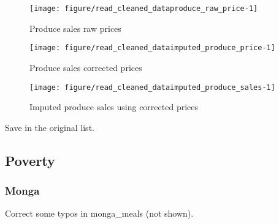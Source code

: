 \begin{Schunk}
\begin{figure}

{\centering \texttt{[image: figure/read\_cleaned\_dataproduce\_raw\_price-1]} 

}

\caption[Produce sales raw prices]{Produce sales raw prices}\label{Figure produce raw price}
\end{figure}
\end{Schunk}
\begin{Schunk}
\begin{figure}

{\centering \texttt{[image: figure/read\_cleaned\_dataimputed\_produce\_price-1]} 

}

\caption[Produce sales corrected prices]{Produce sales corrected prices}\label{Figure imputed produce price}
\end{figure}
\end{Schunk}
\begin{Schunk}
\begin{figure}

{\centering \texttt{[image: figure/read\_cleaned\_dataimputed\_produce\_sales-1]} 

}

\caption[Imputed produce sales using corrected prices]{Imputed produce sales using corrected prices}\label{Figure imputed produce sales}
\end{figure}
\end{Schunk}
Save in the original list.
\begin{Schunk}
\end{Schunk}

\subsection{Poverty}

\subsubsection{Monga}


Correct some typos in \textsf{monga\_meals} (not shown). \gobblepars

